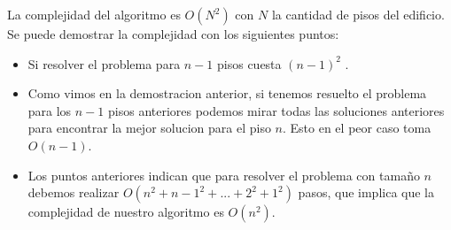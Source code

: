 La complejidad del algoritmo es $O(N^2)$ con $N$ la cantidad de pisos del edificio.
Se puede demostrar la complejidad con los siguientes puntos:
\begin{itemize}
\item Si resolver el problema para $n-1$ pisos cuesta $(n-1)^2$ .
\item Como vimos en la demostracion anterior, si tenemos resuelto el problema para los $n-1$ pisos anteriores podemos mirar todas las soluciones anteriores para encontrar la mejor solucion para el piso $n$. Esto en el peor caso toma $O(n-1)$.
\item Los puntos anteriores indican que para resolver el problema con tamaño $n$ debemos realizar $O({n}^{2} + {n-1}^2 + ... + {2}^{2} + 1^{2})$ pasos, que implica que la complejidad de nuestro algoritmo es $O(n^{2})$.
\end{itemize}